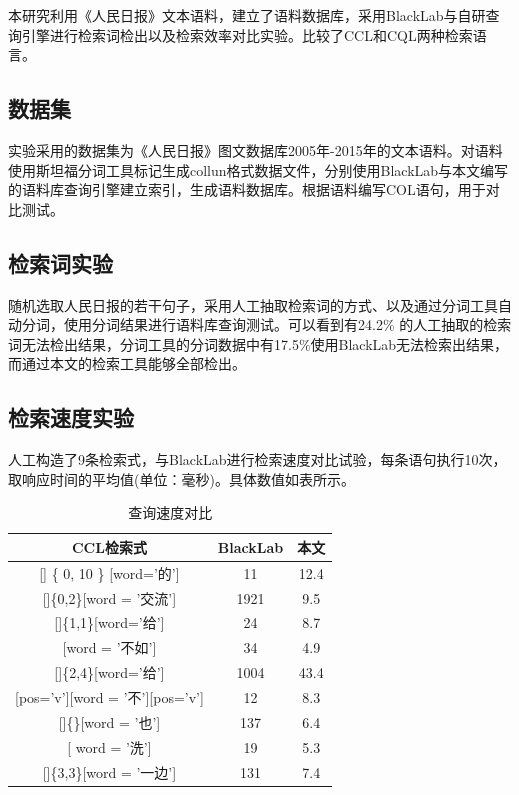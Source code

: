 \documentclass[11pt]{article}
\begin{document}
\begin{CJK*}{UTF8}{gbsn}
本研究利用《人民日报》文本语料，建立了语料数据库，采用BlackLab与自研查询引擎进行检索词检出以及检索效率对比实验。比较了CCL和CQL两种检索语言。

\subsection{数据集}

实验采用的数据集为《人民日报》图文数据库2005年-2015年的文本语料。对语料使用斯坦福分词工具标记生成collun格式数据文件，分别使用BlackLab与本文编写的语料库查询引擎建立索引，生成语料数据库。根据语料编写COL语句，用于对比测试。

\subsection{检索词实验}

随机选取人民日报的若干句子，采用人工抽取检索词的方式、以及通过分词工具自动分词，使用分词结果进行语料库查询测试。可以看到有24.2\% 的人工抽取的检索词无法检出结果，分词工具的分词数据中有17.5\%使用BlackLab无法检索出结果，而通过本文的检索工具能够全部检出。 

\subsection{检索速度实验}

人工构造了9条检索式，与BlackLab进行检索速度对比试验，每条语句执行10次，取响应时间的平均值(单位：毫秒)。具体数值如表所示。

\begin{table}[h]
	\begin{center}
		\begin{tabular}{c|c|c}
			\hline \bf CCL检索式 & \bf BlackLab & \bf 本文 \\ \hline
			[word=“的”][] \{ 0, 10 \} [word='的'] & 11 & 12.4 \\ \hline
			[word = '文化'][]\{0,2\}[word = '交流'] & 1921 & 9.5 \\
			\hline
			[word='把'][]\{1,1\}[word='给'] & 24 & 8.7 \\
			\hline
			[word = '与其'][word = '不如'] & 34 & 4.9 \\
			\hline
			[word='把'  \textbar word='被'][]\{2,4\}[word='给'] & 1004 & 43.4 \\
			\hline
			[word = '爱'][pos='v'][word = '不'][pos='v'] & 12 & 8.3 \\
			\hline
			[word = '宁可'][]\{\}[word = '也'] & 137 & 6.4 \\
			\hline
			[word = '澡'][ word = '洗'] & 19 & 5.3 \\
			\hline
			[word = '一边'][]\{3,3\}[word = '一边'] & 131 & 7.4 \\
			\hline
		\end{tabular}
	\end{center}
	\caption{\label{speed-table} 查询速度对比}
\end{table}


\end{CJK*}
\end{document}
